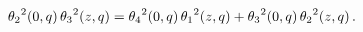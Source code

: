 \[{\mathop{\theta_{2}\/}\nolimits^{2}}\!\left(0,q\right){\mathop{\theta_{3}\/}%
\nolimits^{2}}\!\left(z,q\right)={\mathop{\theta_{4}\/}\nolimits^{2}}\!\left(0%
,q\right){\mathop{\theta_{1}\/}\nolimits^{2}}\!\left(z,q\right)+{\mathop{%
\theta_{3}\/}\nolimits^{2}}\!\left(0,q\right){\mathop{\theta_{2}\/}\nolimits^{%
2}}\!\left(z,q\right).\]